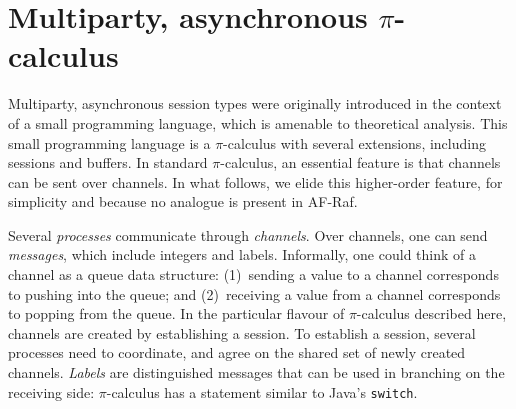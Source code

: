 \documentclass[a4paper,12pt,oneside,fleqn]{book} %
\begin{document}
\section{Multiparty, asynchronous $\pi$-calculus}
\label{sec:pi}

Multiparty, asynchronous session types were originally introduced
  in the context of a small programming language,
    which is amenable to theoretical analysis.
This small programming language
  is a $\pi$-calculus with several extensions,
  including sessions and buffers.
In standard $\pi$-calculus,
  an essential feature is that channels can be sent over channels.
In what follows,
  we elide this higher-order feature,
  for simplicity and because no analogue is present in AF-Raf.

Several \emph{processes} communicate through \emph{channels}.
Over channels, one can send \emph{messages},
  which include integers and labels.
Informally, one could think of a channel as a queue data structure:
(1)~sending a value to a channel corresponds to pushing into the queue; and
(2)~receiving a value from a channel corresponds to popping from the queue.
In the particular flavour of $\pi$-calculus described here,
  channels are created by establishing a session.
To establish a session,
  several processes need to coordinate,
  and agree on the shared set of newly created channels.
\emph{Labels} are distinguished messages
  that can be used in branching on the receiving side:
  $\pi$-calculus has a statement similar to Java's {\tt switch}.
\end{document}
